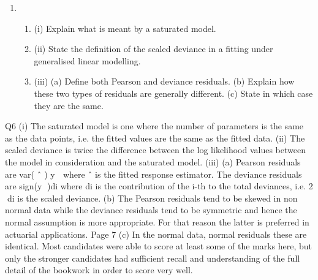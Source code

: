 \documentclass[a4paper,12pt]{article}
\begin{document}
\begin{enumerate}

\item %

\begin{enumerate}
\item (i) Explain what is meant by a saturated model. 
\item(ii) State the definition of the scaled deviance in a fitting under generalised
linear modelling. 
\item (iii) (a) Define both Pearson and deviance residuals.
(b) Explain how these two types of residuals are generally different.
(c) State in which case they are the same. 
\end{enumerate}
\end{enumerate}
\newpage

Q6 (i) The saturated model is one where the number of parameters is the same as the
data points,
i.e. the fitted values are the same as the fitted data.
(ii) The scaled deviance is twice the difference between the log likelihood values between the model in consideration and the saturated model.
(iii) (a) Pearson residuals are
var( ˆ )
y 
\mu
where ˆ \mu is the fitted response
estimator.
The deviance residuals are sign(y )di where di is the contribution of
the i-th to the total deviances,
i.e. 2
di is the scaled deviance.
(b) The Pearson residuals tend to be skewed in non normal data while the deviance residuals tend to be symmetric and hence the
normal assumption is more appropriate.
For that reason the latter is preferred in actuarial applications.
Page 7
(c) In the normal data, normal residuals these are identical.
Most candidates were able to score at least some of the marks here, but only the stronger candidates had sufficient recall and understanding of the full detail of the bookwork in order to score very well.
\end{document}

